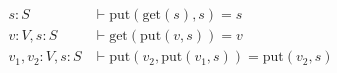 \begin{align}
  s:S & \vdash \text{put} ( \text{get} (s), s ) = s \label{eq:get-put} \tag{Get-Put} \\
  v:V, s:S & \vdash \text{get} ( \text{put} (v, s) ) = v \label{eq:put-get} \tag{Put-Get} \\
  v_1, v_2: V, s: S & \vdash \text{put} (v_2, \text{put} (v_1, s)) = \text{put} (v_2, s) \label{eq:put-put} \tag{Put-Put}
\end{align}